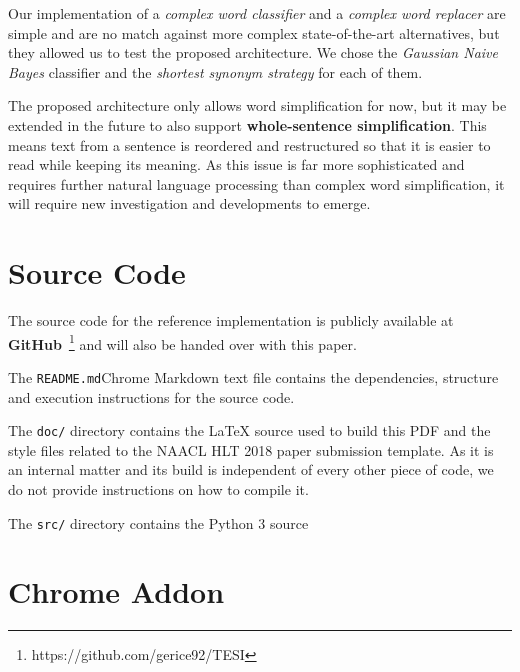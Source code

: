 \documentclass[11pt,a4paper]{article}
\begin{document}
Our implementation of a \emph{complex word classifier} and a \emph{complex word replacer} are simple and are no match against more complex state-of-the-art alternatives, but they allowed us to test the proposed architecture. We chose the \emph{Gaussian Naive Bayes} classifier and the \emph{shortest synonym strategy} for each of them.

The proposed architecture only allows word simplification for now, but it may be extended in the future to also support \textbf{whole-sentence simplification}. This means text from a sentence is reordered and restructured so that it is easier to read while keeping its meaning. As this issue is far more sophisticated and requires further natural language processing than complex word simplification, it will require new investigation and developments to emerge.




\appendix

\section{Source Code}
\label{sec:src}

The source code for the reference implementation is publicly available at \textbf{GitHub}~\footnote{https://github.com/gerice92/TESI} and will also be handed over with this paper.

The \verb|README.md|Chrome Markdown text file contains the dependencies, structure and execution instructions for the source code.

The \verb|doc/| directory contains the \LaTeX{} source used to build this PDF and the style files related to the NAACL HLT 2018 paper submission template. As it is an internal matter and its build is independent of every other piece of code, we do not provide instructions on how to compile it.

The \verb|src/| directory contains the Python 3 source

\section{Chrome Addon}
\label{sec:mfx}
\end{document}
